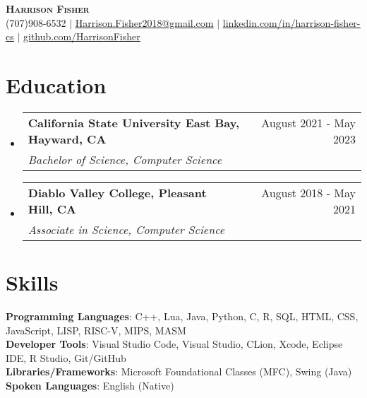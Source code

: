\documentclass[letterpaper, 11pt]{article}
\makeatletter
\newcommand{\resumeSubheading}[4]{
  \vspace{-2pt}\item
    \begin{tabular*}{0.97\textwidth}[t]{l@{\extracolsep{\fill}}r}
      \textbf{#1} & #2 \\
      \textit{\small#3} & \textit{\small #4} \\
    \end{tabular*}\vspace{-7pt}
}
\newcommand{\resumeSubHeadingListStart}{\begin{itemize}[leftmargin=0.15in, label={}]}
\newcommand{\resumeSubHeadingListEnd}{\end{itemize}}
\makeatother
\begin{document}

\begin{center}
    \textbf{\Huge \scshape Harrison Fisher} \\ \vspace{7pt}
    \small (707)908-6532 $ | $ 
    \href{Harrison.Fisher2018@gmail.com}{\underline{Harrison.Fisher2018@gmail.com}} $ | $ 
    \href{https://www.linkedin.com/in/harrison-fisher-cs/}{\underline{\faLinkedin \hspace{1pt} linkedin.com/in/harrison-fisher-cs}} $ | $
    \href{https://github.com/HarrisonFisher}{\underline{\faGithub \hspace{1pt} github.com/HarrisonFisher}}
\end{center}




  

\section{Education}
  \resumeSubHeadingListStart
    \resumeSubheading
      {California State University East Bay, Hayward, CA}{August 2021 - May 2023}
      {Bachelor of Science, Computer Science}{}

    \resumeSubheading
      {Diablo Valley College, Pleasant Hill, CA}{August 2018 - May 2021}
      {Associate  in Science, Computer Science}{}
  \resumeSubHeadingListEnd
  
\section{Skills}
 \begin{itemize}[leftmargin=0.15in, label={}]
    \small{\item{
     \textbf{Programming Languages}{: C++, Lua, Java, Python, C, R, SQL, HTML, CSS, JavaScript, LISP, RISC-V, MIPS, MASM} \\
     \textbf{Developer Tools}{: Visual Studio Code, Visual Studio, CLion, Xcode, Eclipse IDE, R Studio, Git/GitHub} \\
     \textbf{Libraries/Frameworks}{: Microsoft Foundational Classes (MFC), Swing (Java)} \\
     \textbf{Spoken Languages}{: English (Native)} \\
    }}
 \end{itemize}
\end{document}
